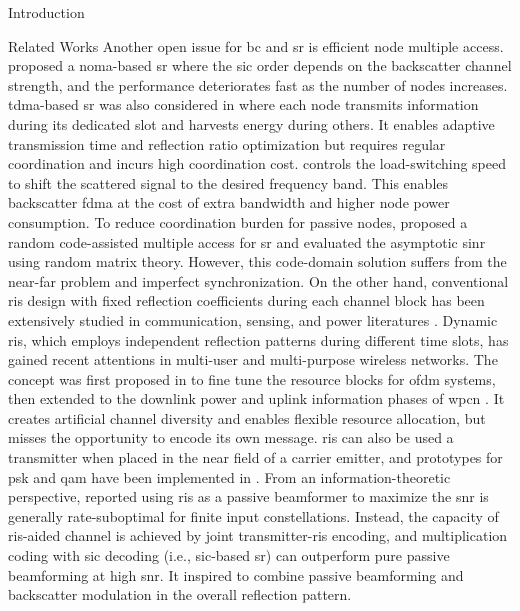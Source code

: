 \documentclass[journal]{IEEEtran}
\begin{document}
\begin{section}{Introduction}
\begin{subsection}{Related Works}
		Another open issue for \gls{bc} and \gls{sr} is efficient node multiple access.
		\cite{Xu2021a} proposed a \gls{noma}-based \gls{sr} where the \gls{sic} order depends on the backscatter channel strength, and the performance deteriorates fast as the number of nodes increases.
		\gls{tdma}-based \gls{sr} was also considered in \cite{Yang2021a} where each node transmits information during its dedicated slot and harvests energy during others.
		It enables adaptive transmission time and reflection ratio optimization but requires regular coordination and incurs high coordination cost.
		\cite{Vougioukas2019} controls the load-switching speed to shift the scattered signal to the desired frequency band.
		This enables backscatter \gls{fdma} at the cost of extra bandwidth and higher node power consumption.
		To reduce coordination burden for passive nodes, \cite{Han2021} proposed a random code-assisted multiple access for \gls{sr} and evaluated the asymptotic \gls{sinr} using random matrix theory.
		However, this code-domain solution suffers from the near-far problem and imperfect synchronization.
		On the other hand, conventional \gls{ris} design with fixed reflection coefficients during each channel block has been extensively studied in communication, sensing, and power literatures \cite{Wu2018,Zhang2019a,Lin2022,Liu2022,Feng2022,Zhao2022}.
		Dynamic \gls{ris}, which employs independent reflection patterns during different time slots, has gained recent attentions in multi-user and multi-purpose wireless networks.
		The concept was first proposed in \cite{Yang2020} to fine tune the resource blocks for \gls{ofdm} systems, then extended to the downlink power and uplink information phases of \gls{wpcn} \cite{Wu2021,Wu2021d,Hua2022a}.
		It creates artificial channel diversity and enables flexible resource allocation, but misses the opportunity to encode its own message.
		\gls{ris} can also be used a transmitter when placed in the near field of a carrier emitter, and prototypes for \gls{psk} and \gls{qam} have been implemented in \cite{Tang2019a,Dai2020a}.
		From an information-theoretic perspective, \cite{Karasik2020} reported using \gls{ris} as a passive beamformer to maximize the \gls{snr} is generally rate-suboptimal for finite input constellations.
		Instead, the capacity of \gls{ris}-aided channel is achieved by joint transmitter-\gls{ris} encoding, and multiplication coding with \gls{sic} decoding (i.e., \gls{sic}-based \gls{sr}) can outperform pure passive beamforming at high \gls{snr}.
		It inspired \cite{Liu2019d,Bereyhi2020,Xu2020b,Zhang2021d,Hu2021b,Hua2022,Basar2020,Ma2020a,Yuan2021,Hu2021a} to combine passive beamforming and backscatter modulation in the overall reflection pattern.

\end{subsection}
\end{section}
\end{document}
